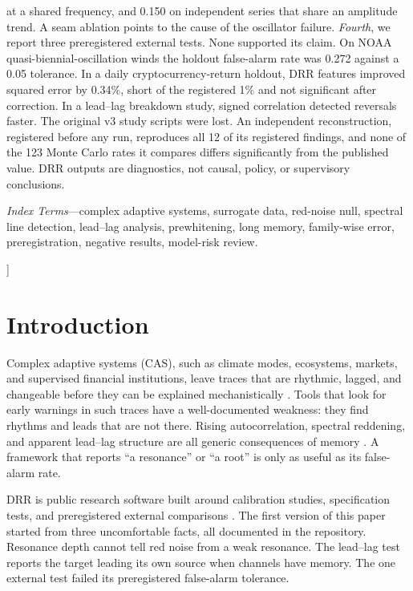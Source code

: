 \documentclass[10pt,twocolumn,letterpaper]{article}
\theoremstyle{definition}
\theoremstyle{remark}
\begin{document}
{\begin{minipage}{\textwidth}
at a shared frequency, and 0.150 on independent series that share an amplitude
trend. A seam ablation points to the cause of the oscillator failure.
\emph{Fourth}, we report three preregistered external tests. None supported its
claim. On NOAA quasi-biennial-oscillation winds the holdout false-alarm rate was
0.272 against a 0.05 tolerance. In a daily cryptocurrency-return holdout, DRR
features improved squared error by 0.34\%, short of the registered 1\% and not
significant after correction. In a lead--lag breakdown study, signed correlation
detected reversals faster. The original v3 study scripts were lost. An
independent reconstruction, registered before any run, reproduces all 12 of its
registered findings, and none of the 123 Monte Carlo rates it compares differs
significantly from the published value. DRR outputs are diagnostics, not causal,
policy, or supervisory conclusions.

\smallskip
\noindent\textit{Index Terms}---complex adaptive systems, surrogate data,
red-noise null, spectral line detection, lead--lag analysis, prewhitening,
long memory, family-wise error, preregistration, negative results, model-risk
review.
\end{minipage}
\vspace{14pt}
}]

\section{Introduction}

Complex adaptive systems (CAS), such as climate modes, ecosystems, markets, and
supervised financial institutions, leave traces that are rhythmic, lagged, and
changeable before they can be explained mechanistically \cite{holland,mitchell}.
Tools that look for early warnings in such traces have a well-documented
weakness: they find rhythms and leads that are not there. Rising
autocorrelation, spectral reddening, and apparent lead--lag structure are all
generic consequences of memory \cite{ditlevsen,boettiger}. A framework that
reports ``a resonance'' or ``a root'' is only as useful as its false-alarm rate.

DRR is public research software built around calibration studies,
specification tests, and preregistered external comparisons \cite{drr}. The
first version of this paper started from three uncomfortable facts, all
documented in the repository. Resonance depth cannot tell red noise from a weak
resonance. The lead--lag test reports the target leading its own source when
channels have memory. The one external test failed its preregistered
false-alarm tolerance.
\end{document}
